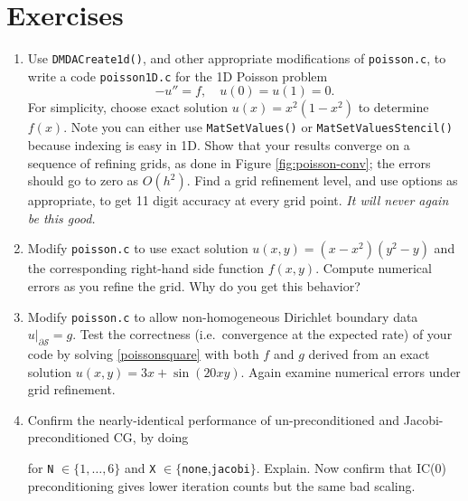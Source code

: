 \section{Exercises}

\renewcommand{\labelenumi}{\arabic{chapter}.\arabic{enumi}\quad}

\begin{enumerate}

\item Use \texttt{DMDACreate1d()}, and other appropriate modifications of \texttt{poisson.c}, to write a code \texttt{poisson1D.c} for the 1D Poisson problem
    $$-u'' = f, \quad u(0)=u(1)=0.$$
For simplicity, choose exact solution $u(x)=x^2(1-x^2)$ to determine $f(x)$.  Note you can either use \texttt{MatSetValues()} or \texttt{MatSetValuesStencil()} because indexing is easy in 1D.  Show that your results converge on a sequence of refining grids, as done in Figure \ref{fig:poisson-conv}; the errors should go to zero as $O(h^2)$.  Find a grid refinement level, and use \pKSP options as appropriate, to get 11 digit accuracy at every grid point.  \emph{It will never again be this good.}

\item \label{exer:st:quadraticnongeneric}  Modify \texttt{poisson.c} to use exact solution $u(x,y)=(x-x^2)(y^2-y)$ and the corresponding right-hand side function $f(x,y)$.  Compute numerical errors as you refine the grid.  Why do you get this behavior?

\item Modify \texttt{poisson.c} to allow non-homogeneous Dirichlet boundary data $u|_{\partial \mathcal{S}}=g$.  Test the correctness (i.e.~convergence at the expected rate) of your code by solving \eqref{poissonsquare} with both $f$ and $g$ derived from an exact solution $u(x,y)=3x + \sin(20xy)$.  Again examine  numerical errors under grid refinement.

\item \label{exer:st:jacobivsnone} Confirm the nearly-identical performance of un-preconditioned and Jacobi-preconditioned CG, by doing
for \texttt{N} $\in\{1,\dots,6\}$ and \texttt{X} $\in\{$\texttt{none},\texttt{jacobi}$\}$.  Explain.
Now confirm that IC($0$) preconditioning gives lower iteration counts but the same bad scaling.


\end{enumerate}
